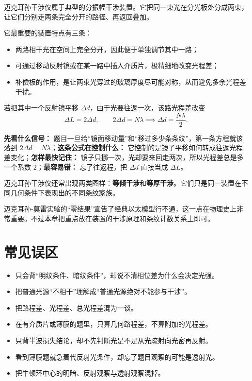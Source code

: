 \documentclass[lang=cn,11pt]{elegantbook}
\begin{document}
迈克耳孙干涉仪属于典型的分振幅干涉装置。它把同一束光在分光板处分成两束，让它们分别走两条完全分开的路径、再返回叠加。

它最重要的装置特点有三条：
\begin{itemize}
  \item 两路相干光在空间上完全分开，因此便于单独调节其中一路；
  \item 可通过移动反射镜或在某一路中插入介质片，极精细地改变光程差；
  \item 补偿板的作用，是让两束光穿过的玻璃厚度尽可能对称，从而避免多余光程差干扰。
\end{itemize}

若把其中一个反射镜平移 \(\Delta d\)，由于光要往返一次，该路光程差改变
\[
\Delta L=2\Delta d,\qquad
2\Delta d=N\lambda
\implies
\Delta d=\frac{N\lambda}{2}.
\]

\begin{note}
\textbf{先看什么信号：} 题目一旦给“镜面移动量”和“移过多少条条纹”，第一条方程就该落到 \(2\Delta d=N\lambda\)；\textbf{这条公式在控制什么：} 它控制的是镜子平移如何转成往返光程差变化；\textbf{怎样最快记住：} 镜子只挪一次，光却要来回走两次，所以光程差总是多一个系数 \(2\)；\textbf{最容易错：} 忘了往返程，把 \(\Delta d\) 直接当成 \(\Delta L\)。
\end{note}

迈克耳孙干涉仪还常出现两类图样：\textbf{等倾干涉}和\textbf{等厚干涉}。它们只是同一装置在不同几何条件下表现出的不同条纹家族。

\begin{remark}
迈克耳孙-莫雷实验的“零结果”宣告了经典以太模型行不通，这一点在物理史上非常重要。不过本章把重点放在装置的干涉原理和条纹计数关系上即可。
\end{remark}

\section{常见误区}

\begin{itemize}
  \item 只会背“明纹条件、暗纹条件”，却说不清相位差为什么会决定光强。
  \item 把普通光源“不相干”理解成“普通光源绝对不能参与干涉”。
  \item 把路程差、光程差、总光程差混为一谈。
  \item 在有介质片或薄膜的题里，只算几何路程差，不算附加的光程差。
  \item 只背半波损失结论，却不先判断光是不是从光疏射向光密再反射。
  \item 看到薄膜题就急着代反射光条件，却忘了题目观察的可能是透射光。
  \item 把牛顿环中心的明暗、反射观察与透射观察混掉。
\end{itemize}
\end{document}
